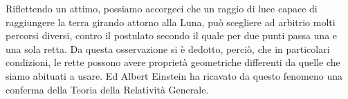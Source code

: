 Riflettendo un attimo, possiamo accorgeci che un raggio di luce capace di raggiungere la terra girando attorno alla
Luna, può scegliere ad arbitrio molti percorsi diversi, contro il postulato secondo il quale per due punti passa una e
una sola retta. Da questa osservazione si è dedotto, perciò, che in particolari condizioni, le rette possono avere
proprietà geometriche differenti da quelle che siamo abituati a usare. Ed Albert Einstein ha ricavato da questo
fenomeno una conferma della Teoria della Relatività Generale.
